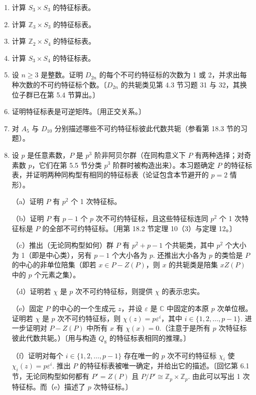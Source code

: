 \begin{enumerate}
\item 计算 \(S_3 \times S_3\) 的特征标表。

\item 计算 \(\mathbb{Z}_3 \times S_3\) 的特征标表。

\item 计算 \(\mathbb{Z}_2 \times S_4\) 的特征标表。

\item 计算 \(S_3 \times S_4\) 的特征标表。

\item 设 \(n \geq 3\) 是整数。证明 \(D_{2n}\) 的每个不可约特征标的次数为 1 或 2，并求出每种次数的不可约特征标个数。〔\(D_{2n}\) 的共轭类见第 4.3 节习题 31 与 32，其换位子群已在第 5.4 节算出。〕

\item 证明特征标表是可逆矩阵。〔用正交关系。〕

\item 对 \(A_5\) 与 \(D_{10}\) 分别描述哪些不可约特征标彼此代数共轭（参看第 18.3 节的习题）。

\item 设 \(p\) 是任意素数，\(P\) 是 \(p^3\) 阶非阿贝尔群（在同构意义下 \(P\) 有两种选择；对奇素数 \(p\)，它们在第 5.5 节分类 \(p^3\) 阶群时被构造出来）。本习题确定 \(P\) 的特征标表，并证明两种同构型有相同的特征标表（论证包含本节避开的 \(p = 2\) 情形）。

（a）证明 \(P\) 有 \(p^2\) 个 1 次特征标。

（b）证明 \(P\) 有 \(p - 1\) 个 \(p\) 次不可约特征标，且这些特征标连同 \(p^2\) 个 1 次特征标是 \(P\) 的全部不可约特征标。〔用第 18.2 节定理 10（3）与定理 12。〕

（c）推出（无论同构型如何）群 \(P\) 有 \(p^2+p-1\) 个共轭类，其中 \(p^2\) 个大小为 1（即是中心类），另有 \(p-1\) 个大小各为 \(p\). 还推出大小各为 \(p\) 的类恰是 \(P\) 的中心的非单位陪集（即若 \(x \in P - Z(P)\)，则 \(x\) 的共轭类是陪集 \(xZ(P)\) 中的 \(p\) 个元素之集）。

（d）证明若 \(\chi\) 是 \(p\) 次不可约特征标，则提供 \(\chi\) 的表示忠实。

（e）固定 \(P\) 的中心的一个生成元 \(z\)，并设 \(\varepsilon\) 是 \(\mathbb{C}\) 中固定的本原 \(p\) 次单位根。证明若 \(\chi\) 是 \(p\) 次不可约特征标，则 \(\chi(z) = p\varepsilon^i\)，其中 \(i \in \{1, 2, \ldots, p-1\}\). 进一步证明对 \(P - Z(P)\) 中所有 \(x\) 有 \(\chi(x) = 0\).（注意于是所有 \(p\) 次特征标彼此代数共轭。）〔用与构造 \(Q_8\) 的特征标表相同的推理。〕

（f）证明对每个 \(i \in \{1, 2, \ldots, p-1\}\) 存在唯一的 \(p\) 次不可约特征标 \(\chi_i\) 使 \(\chi_i(z) = p\varepsilon^i\). 推出 \(P\) 的特征标表被唯一确定，并给出它的描述。〔回忆第 6.1 节，无论同构型如何都有 \(P' = Z(P)\) 且 \(P/P' \cong \mathbb{Z}_p \times \mathbb{Z}_p\). 由此可以写出 1 次特征标。而（e）描述了 \(p\) 次特征标。〕
\end{enumerate}

